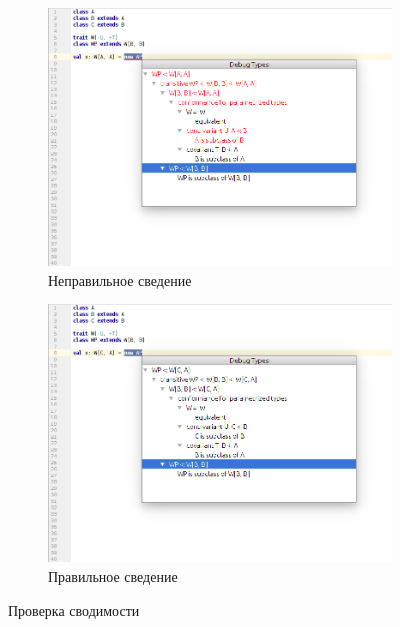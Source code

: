 \begin{figure}[h!]
  \centering
  \begin{subfigure}{\linewidth}
    \centering
    \includegraphics[width=.8\linewidth]{img/conformance1}
    \caption{Неправильное сведение}
  \end{subfigure}

  \begin{subfigure}{\linewidth}
    \centering
    \includegraphics[width=.8\linewidth]{img/conformance2}
    \caption{Правильное сведение}
  \end{subfigure}
  \caption{Проверка сводимости}
  \label{fig:overloading}
\end{figure}
